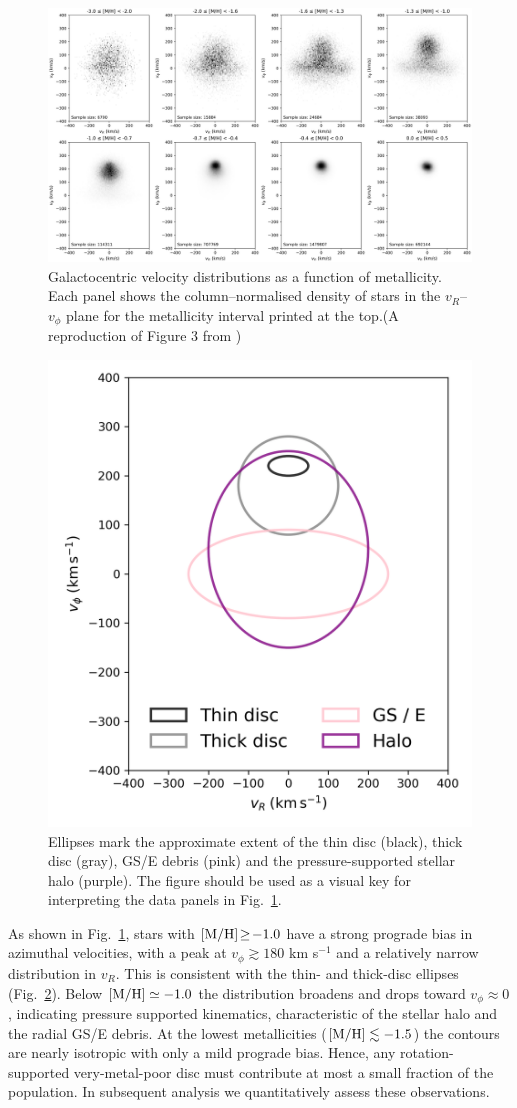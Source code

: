 \documentclass[a4paper,12pt]{article}
\begin{document}
\begin{figure}
  \centering
  \includegraphics[width=\textwidth]
                   {../figures/vphi_metallicity_histograms.png}
  \caption{Galactocentric velocity distributions as a function of metallicity.
           Each panel shows the column–normalised density of stars in the
           $v_R$–$v_\phi$ plane for the metallicity interval printed at the
           top.(A reproduction of Figure 3 from \citet{zhang2024existencemetalpoordiscmilky})
           }
  \label{fig:vRvphi_bins}
\end{figure}

\begin{figure}
  \centering
  \includegraphics[width=0.3\columnwidth]
                   {../figures/reference_velocity_ellipses.png}
  \caption{Ellipses mark the approximate extent of the thin disc
           (black), thick disc (gray),
           GS/E debris (pink) and the
           pressure-supported stellar halo (purple).
           The figure should be used as a visual key for interpreting the data panels
           in Fig.~\ref{fig:vRvphi_bins}.
           }
  \label{fig:ref_ellipses}
\end{figure}

As shown in Fig.~\ref{fig:vRvphi_bins}, stars with
${\rm[M/H]}\!\geq\!-1.0$ have a strong prograde bias in azimuthal velocities, 
with a peak at $v_\phi\!\gtrsim\!180$ km s$^{-1}$ and a relatively narrow
distribution in $v_R$. This is consistent with 
the thin- and thick-disc ellipses (Fig.~\ref{fig:ref_ellipses}). 
Below ${\rm[M/H]}\simeq-1.0$ the distribution broadens and
drops toward $v_\phi\!\approx\!0$, indicating
pressure supported kinematics, characteristic of the stellar halo and
the radial GS/E debris.  At the lowest
metallicities (${\rm[M/H]}\lesssim-1.5$) the contours are nearly
isotropic with only a mild prograde bias.  Hence, any
rotation-supported very-metal-poor disc must contribute at most a
small fraction of the population. In subsequent analysis we quantitatively assess
these observations.
\end{document}
